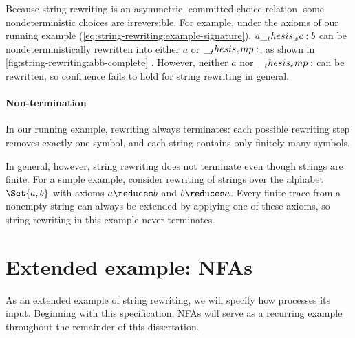 Because string rewriting is an asymmetric, committed-choice relation, some nondeterministic choices are irreversible.
For example, under the axioms of our running example (\cref{eq:string-rewriting:example-signature}), $a \wc b$ can be nondeterministically rewritten into either $a$ or $\__thesis_emp:$, as shown in \cref{fig:string-rewriting:abb-complete}%
.
However, neither $a$ nor $\__thesis_emp:$ can be rewritten, so confluence fails to hold for string rewriting in general.

\paragraph*{Non-termination}
In our running example, rewriting always terminates: each possible rewriting step removes exactly one symbol, and each string contains only finitely many symbols.

In general, however, string rewriting does not terminate even though strings are finite.
For a simple example, consider rewriting of strings over the alphabet $\Set{a,b}$ with axioms
$a \reduces b$ and $b \reduces a$.
Every finite trace from a nonempty string can always be extended by applying one of these axioms, so string rewriting in this example never terminates.

\section{Extended example: \Aclp*{NFA}}\label{sec:string-rewriting:nfa}

As an extended example of string rewriting, we will specify how  processes its input.
Beginning with this specification, \acp{NFA} will serve as a recurring example throughout the remainder of this dissertation.
 

